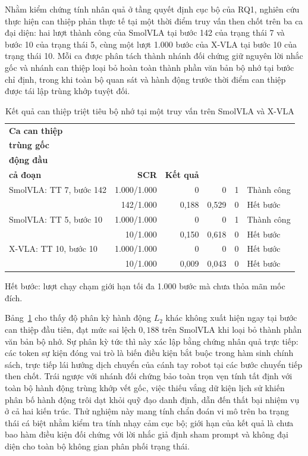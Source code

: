 Nhằm kiểm chứng tính nhân quả ở tầng quyết định cục bộ của RQ1, nghiên cứu thực hiện can thiệp phản thực tế tại một thời điểm truy vấn then chốt trên ba ca đại diện: hai lượt thành công của SmolVLA tại bước 142 của trạng thái 7 và bước 10 của trạng thái 5, cùng một lượt 1.000 bước của X-VLA tại bước 10 của trạng thái 10. Mỗi ca được phân tách thành nhánh đối chứng giữ nguyên lời nhắc gốc và nhánh can thiệp loại bỏ hoàn toàn thành phần văn bản bộ nhớ tại bước chỉ định, trong khi toàn bộ quan sát và hành động trước thời điểm can thiệp được tái lập trùng khớp tuyệt đối.

\begin{table}[htbp]
\centering\small
\caption{Kết quả can thiệp triệt tiêu bộ nhớ tại một truy vấn trên SmolVLA và X-VLA}
\label{tab:e45-one-query}
\setlength{\tabcolsep}{1.5pt}
\begin{tabular}{l|r|r|r|r|l}
\toprule
\textbf{Ca can thiệp} & \shortstack{\textbf{Hành động}\\\textbf{trùng gốc}} & \shortstack{\textbf{$L_2$ hành}\\\textbf{động đầu}} & \shortstack{\textbf{$L_2$}\\\textbf{cả đoạn}} & \textbf{SCR} & \textbf{Kết quả} \\
\midrule
SmolVLA: TT 7, bước 142 & 1.000/1.000 & 0 & 0 & 1 & Thành công \\
  & 142/1.000 & 0,188 & 0,529 & 0 & Hết bước \\
\midrule
SmolVLA: TT 5, bước 10 & 1.000/1.000 & 0 & 0 & 1 & Thành công \\
  & 10/1.000 & 0,150 & 0,618 & 0 & Hết bước \\
\midrule
X-VLA: TT 10, bước 10  & 1.000/1.000 & 0 & 0 & 0 & Hết bước \\
  & 10/1.000 & 0,009 & 0,043 & 0 & Hết bước \\
\bottomrule
\end{tabular}
\par\smallskip
{\footnotesize Hết bước: lượt chạy chạm giới hạn tối đa 1.000 bước mà chưa thỏa mãn mốc đích.\par}
\end{table}

Bảng~\ref{tab:e45-one-query} cho thấy độ phân kỳ hành động $L_2$ khác không xuất hiện ngay tại bước can thiệp đầu tiên, đạt mức sai lệch $0{,}188$ trên SmolVLA khi loại bỏ thành phần văn bản bộ nhớ. Sự phân kỳ tức thì này xác lập bằng chứng nhân quả trực tiếp: các token sự kiện đóng vai trò là biến điều kiện bắt buộc trong hàm sinh chính sách, trực tiếp lái hướng dịch chuyển của cánh tay robot tại các bước chuyển tiếp then chốt. Trái ngược với nhánh đối chứng bảo toàn trọn vẹn tính tất định với toàn bộ hành động trùng khớp vết gốc, việc thiếu vắng dữ kiện lịch sử khiến phân bố hành động trôi dạt khỏi quỹ đạo danh định, dẫn đến thất bại nhiệm vụ ở cả hai kiến trúc. Thử nghiệm này mang tính chẩn đoán vi mô trên ba trạng thái cá biệt nhằm kiểm tra tính nhạy cảm cục bộ; giới hạn của kết quả là chưa bao hàm điều kiện đối chứng với lời nhắc giả định sham prompt và không đại diện cho toàn bộ không gian phân phối trạng thái.

